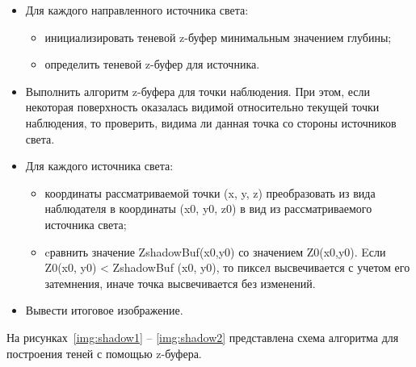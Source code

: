\begin{itemize}
    \item Для каждого направленного источника света:
    \begin{itemize}
        \item инициализировать теневой z-буфер минимальным значением глубины; 
        \item определить теневой z-буфер для источника. 
    \end{itemize}
    \item Выполнить алгоритм z-буфера для точки наблюдения. 
    При этом, если некоторая поверхность оказалась видимой относительно 
    текущей точки наблюдения, то проверить, видима ли данная точка со стороны 
    источников света. 
    \item Для каждого источника света: 
    \begin{itemize}
        \item координаты рассматриваемой точки (x, y, z) преобразовать 
        из вида наблюдателя в координаты (x0, y0, z0) в вид из рассматриваемого источника света; 
        \item cравнить значение ZshadowBuf(x0,y0) со значением Z0(x0,y0). 
        Eсли Z0(x0, y0) < ZshadowBuf (x0, y0), то пиксел высвечивается с учетом его затемнения, 
        иначе точка высвечивается без изменений. 
    \end{itemize}
    \item Вывести итоговое изображение.
\end{itemize}

На рисунках~\ref{img:shadow1} -- \ref{img:shadow2} представлена схема алгоритма для построения теней с помощью z-буфера.


